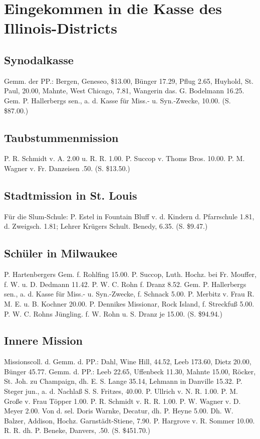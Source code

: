 \chapter[Illinois-District]{Eingekommen in die Kasse des Illinois-Districts}

\section{Synodalkasse}
Gemm. der PP.: Bergen, Geneseo, \$13.00, Bünger 17.29, Pflug 2.65, Huyhold, St. Paul, 20.00, Mahnte, West Chicago, 7.81, Wangerin das. G. Bodelmann 16.25. Gem. P. Hallerbergs sen., a. d. Kasse für Miss.- u. Syn.-Zwecke, 10.00. (S. \$87.00.)

\section{Taubstummenmission}
P. R. Schmidt v. A. 2.00 u. R. R. 1.00. P. Succop v. Thoms Bros. 10.00. P. M. Wagner v. Fr. Danzeisen .50. (S. \$13.50.)

\section{Stadtmission in St. Louis}
Für die Slum-Schule: P. Estel in Fountain Bluff v. d. Kindern d. Pfarrschule 1.81, d. Zweigsch. 1.81; Lehrer Krügers Schult. Benedy, 6.35. (S. \$9.47.)

\section{Schüler in Milwaukee}
P. Hartenbergers Gem. f. Rohlfing 15.00. P. Succop, Luth. Hochz. bei Fr. Mouffer, f. W. u. D. Dedmann 11.42. P. W. C. Rohn f. Dranz 8.52. Gem. P. Hallerbergs sen., a. d. Kasse für Miss.- u. Syn.-Zwecke, f. Schnack 5.00. P. Merbitz v. Frau R. M. E. u. B. Kochner 20.00. P. Dennikes Missionar, Rock Island, f. Streckfuß 5.00. P. W. C. Rohns Jüngling. f. W. Rohn u. S. Dranz je 15.00. (S. \$94.94.)

\section{Innere Mission}
Missionscoll. d. Gemm. d. PP.: Dahl, Wine Hill, 44.52, Leeb 173.60, Dietz 20.00, Bünger 45.77. Gemm. d. PP.: Leeb 22.65, Uffenbeck 11.30, Mahnte 15.00, Röcker, St. Joh. zu Champaign, dh. E. S. Lange 35.14, Lehmann in Danville 15.32. P. Steger jun., a. d. Nachlaß S. S. Fritzes, 40.00. P. Ullrich v. N. R. 1.00. P. M. Große v. Frau Töpper 1.00. P. R. Schmidt v. R. R. 1.00. P. W. Wagner v. D. Meyer 2.00. Von d. sel. Doris Warnke, Decatur, dh. P. Heyne 5.00. Dh. W. Balzer, Addison, Hochz. Garnstädt-Stiene, 7.90. P. Hargrove v. R. Sommer 10.00. R. R. dh. P. Beneke, Danvers, .50. (S. \$451.70.)

